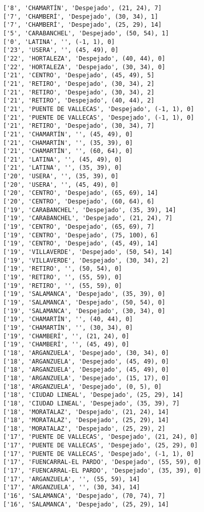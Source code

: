 \documentclass[11pt]{article}
\begin{document}
\begin{Verbatim}[commandchars=\\\{\}]
['8', 'CHAMARTÍN', 'Despejado', (21, 24), 7]
['7', 'CHAMBERÍ', 'Despejado', (30, 34), 1]
['7', 'CHAMBERÍ', 'Despejado', (25, 29), 14]
['5', 'CARABANCHEL', 'Despejado', (50, 54), 1]
['0', 'LATINA', '', (-1, 1), 0]
['23', 'USERA', '', (45, 49), 0]
['22', 'HORTALEZA', 'Despejado', (40, 44), 0]
['22', 'HORTALEZA', 'Despejado', (30, 34), 0]
['21', 'CENTRO', 'Despejado', (45, 49), 5]
['21', 'RETIRO', 'Despejado', (30, 34), 2]
['21', 'RETIRO', 'Despejado', (30, 34), 2]
['21', 'RETIRO', 'Despejado', (40, 44), 2]
['21', 'PUENTE DE VALLECAS', 'Despejado', (-1, 1), 0]
['21', 'PUENTE DE VALLECAS', 'Despejado', (-1, 1), 0]
['21', 'RETIRO', 'Despejado', (30, 34), 7]
['21', 'CHAMARTÍN', '', (45, 49), 0]
['21', 'CHAMARTÍN', '', (35, 39), 0]
['21', 'CHAMARTÍN', '', (60, 64), 0]
['21', 'LATINA', '', (45, 49), 0]
['21', 'LATINA', '', (35, 39), 0]
['20', 'USERA', '', (35, 39), 0]
['20', 'USERA', '', (45, 49), 0]
['20', 'CENTRO', 'Despejado', (65, 69), 14]
['20', 'CENTRO', 'Despejado', (60, 64), 6]
['19', 'CARABANCHEL', 'Despejado', (35, 39), 14]
['19', 'CARABANCHEL', 'Despejado', (21, 24), 7]
['19', 'CENTRO', 'Despejado', (65, 69), 7]
['19', 'CENTRO', 'Despejado', (75, 100), 6]
['19', 'CENTRO', 'Despejado', (45, 49), 14]
['19', 'VILLAVERDE', 'Despejado', (50, 54), 14]
['19', 'VILLAVERDE', 'Despejado', (30, 34), 2]
['19', 'RETIRO', '', (50, 54), 0]
['19', 'RETIRO', '', (55, 59), 0]
['19', 'RETIRO', '', (55, 59), 0]
['19', 'SALAMANCA', 'Despejado', (35, 39), 0]
['19', 'SALAMANCA', 'Despejado', (50, 54), 0]
['19', 'SALAMANCA', 'Despejado', (30, 34), 0]
['19', 'CHAMARTÍN', '', (40, 44), 0]
['19', 'CHAMARTÍN', '', (30, 34), 0]
['19', 'CHAMBERÍ', '', (21, 24), 0]
['19', 'CHAMBERÍ', '', (45, 49), 0]
['18', 'ARGANZUELA', 'Despejado', (30, 34), 0]
['18', 'ARGANZUELA', 'Despejado', (45, 49), 0]
['18', 'ARGANZUELA', 'Despejado', (45, 49), 0]
['18', 'ARGANZUELA', 'Despejado', (15, 17), 0]
['18', 'ARGANZUELA', 'Despejado', (0, 5), 0]
['18', 'CIUDAD LINEAL', 'Despejado', (25, 29), 14]
['18', 'CIUDAD LINEAL', 'Despejado', (35, 39), 7]
['18', 'MORATALAZ', 'Despejado', (21, 24), 14]
['18', 'MORATALAZ', 'Despejado', (25, 29), 14]
['18', 'MORATALAZ', 'Despejado', (25, 29), 2]
['17', 'PUENTE DE VALLECAS', 'Despejado', (21, 24), 0]
['17', 'PUENTE DE VALLECAS', 'Despejado', (25, 29), 0]
['17', 'PUENTE DE VALLECAS', 'Despejado', (-1, 1), 0]
['17', 'FUENCARRAL-EL PARDO', 'Despejado', (55, 59), 0]
['17', 'FUENCARRAL-EL PARDO', 'Despejado', (35, 39), 0]
['17', 'ARGANZUELA', '', (55, 59), 14]
['17', 'ARGANZUELA', '', (30, 34), 14]
['16', 'SALAMANCA', 'Despejado', (70, 74), 7]
['16', 'SALAMANCA', 'Despejado', (25, 29), 14]

\end{Verbatim}
\end{document}

